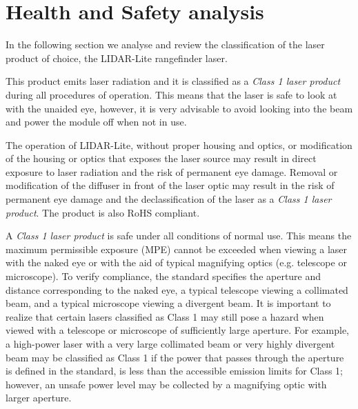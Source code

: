 \clearpage
\section{Health and Safety analysis}

In the following section we analyse and review the classification of the laser product of choice, the LIDAR-Lite rangefinder laser. 

This product emits laser radiation and it is classified as a \textit{Class 1 laser product} during all procedures of operation. This means that the laser is safe to look at with the unaided eye, however, it is very advisable to avoid looking into the beam and power the module off when not in use\cite{laserclass}.

The operation of LIDAR-Lite, without proper housing and optics, or modification of the housing or optics that exposes the laser source may result in direct exposure to laser radiation and the risk of permanent eye damage. Removal or modification of the diffuser in front of the laser optic may result in the risk of permanent eye damage and the declassification of the laser as a \textit{Class 1 laser product}. The product is also RoHS compliant\cite{laserrohs}.

A \textit{Class 1 laser product} is safe under all conditions of normal use. This means the maximum permissible exposure (MPE) cannot be exceeded when viewing a laser with the naked eye or with the aid of typical magnifying optics (e.g. telescope or microscope). To verify compliance, the standard specifies the aperture and distance corresponding to the naked eye, a typical telescope viewing a collimated beam, and a typical microscope viewing a divergent beam.
 It is important to realize that certain lasers classified as Class 1 may still pose a hazard when viewed with a telescope or microscope of sufficiently large aperture. For example, a high-power laser with a very large collimated beam or very highly divergent beam may be classified as Class 1 if the power that passes through the aperture is defined in the standard, is less than the accessible emission limits for Class 1; however, an unsafe power level may be collected by a magnifying optic with larger aperture\cite{laserclass2}.